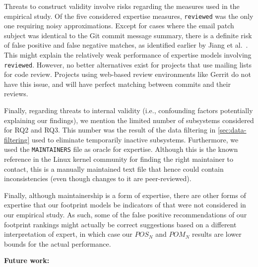 Threats to construct validity involve risks regarding the measures used in the empirical study. Of the five considered expertise measures, \texttt{reviewed} was the only one requiring noisy approximations. Except for cases where the email patch subject was identical to the Git commit message summary, there is a definite risk of false positive and false negative matches, as identified earlier by Jiang et al.~\cite{msr13jojo,jiang14}. This might explain the relatively weak performance of expertise models involving \texttt{reviewed}. However, no better alternatives exist for projects that use mailing lists for code review. Projects using web-based review environments like Gerrit do not have this issue, and will have perfect matching between commits and their reviews.

Finally, regarding threats to internal validity (i.e., confounding factors potentially explaining our findings), we mention the limited number of subsystems considered for RQ2 and RQ3. This number was the result of the data filtering in \autoref{sec:data-filtering} used to eliminate temporarily inactive subsystems. Furthermore, we used the \texttt{MAINTAINERS} file as oracle for expertise. Although this is the known reference in the Linux kernel community for finding the right maintainer to contact, this is a manually maintained text file that hence could contain inconsistencies (even though changes to it are peer-reviewed).

Finally, although maintainership is a form of expertise, there are other forms of expertise that our footprint models be indicators of that were not considered in our empirical study. As such, some of the false positive recommendations of our footprint rankings might actually be correct suggestions based on a different interpretation of expert, in which case our $POS_N$ and $POM_N$ results are lower bounds for the actual performance.


\textbf{Future work:}

